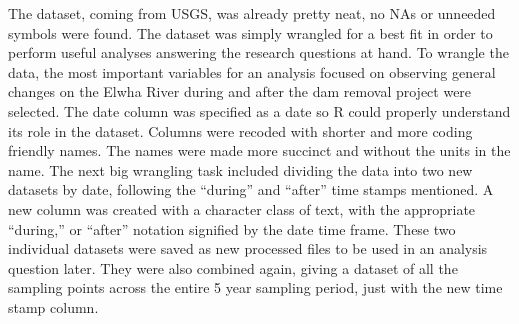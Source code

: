 \documentclass[12pt,]{article}
\begin{document}
The dataset, coming from USGS, was already pretty neat, no NAs or
unneeded symbols were found. The dataset was simply wrangled for a best
fit in order to perform useful analyses answering the research questions
at hand. To wrangle the data, the most important variables for an
analysis focused on observing general changes on the Elwha River during
and after the dam removal project were selected. The date column was
specified as a date so R could properly understand its role in the
dataset. Columns were recoded with shorter and more coding friendly
names. The names were made more succinct and without the units in the
name. The next big wrangling task included dividing the data into two
new datasets by date, following the ``during'' and ``after'' time stamps
mentioned. A new column was created with a character class of text, with
the appropriate ``during,'' or ``after'' notation signified by the date
time frame. These two individual datasets were saved as new processed
files to be used in an analysis question later. They were also combined
again, giving a dataset of all the sampling points across the entire 5
year sampling period, just with the new time stamp column.

\newpage
\end{document}
